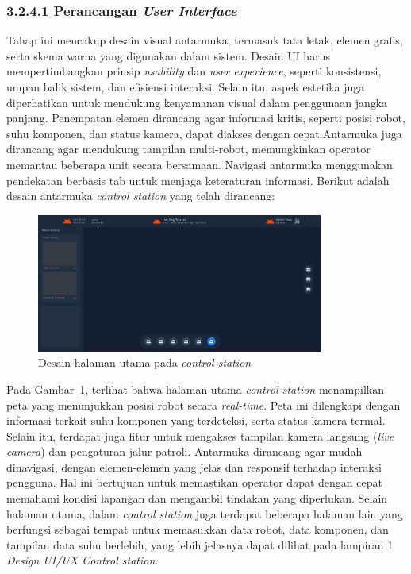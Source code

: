 \subsubsection{3.2.4.1 Perancangan \emph{User Interface}}

Tahap ini mencakup desain visual antarmuka, termasuk tata letak, elemen grafis, serta skema warna yang digunakan dalam sistem. Desain UI harus mempertimbangkan prinsip \emph{usability} dan \emph{user experience}, seperti konsistensi, umpan balik sistem, dan efisiensi interaksi. Selain itu, aspek estetika juga diperhatikan untuk mendukung kenyamanan visual dalam penggunaan jangka panjang. Penempatan elemen dirancang agar informasi kritis, seperti posisi robot, suhu komponen, dan status kamera, dapat diakses dengan cepat.Antarmuka juga dirancang agar mendukung tampilan multi-robot, memungkinkan operator memantau beberapa unit secara bersamaan. Navigasi antarmuka menggunakan pendekatan berbasis tab untuk menjaga keteraturan informasi. Berikut adalah desain antarmuka \emph{control station} yang telah dirancang:

\begin{figure}[H]
  \centering
  \includegraphics[width=0.84\textwidth]{gambar/bab3/homepage.png}
  \caption{Desain halaman utama pada \emph{control station}}
  \label{fig:control-station-robot-main}
\end{figure}


Pada Gambar~\ref{fig:control-station-robot-main}, terlihat bahwa halaman utama \emph{control station} menampilkan peta yang menunjukkan posisi robot secara \emph{real-time}. Peta ini dilengkapi dengan informasi terkait suhu komponen yang terdeteksi, serta status kamera termal. Selain itu, terdapat juga fitur untuk mengakses tampilan kamera langsung (\emph{live camera}) dan pengaturan jalur patroli. Antarmuka dirancang agar mudah dinavigasi, dengan elemen-elemen yang jelas dan responsif terhadap interaksi pengguna. Hal ini bertujuan untuk memastikan operator dapat dengan cepat memahami kondisi lapangan dan mengambil tindakan yang diperlukan. Selain halaman utama, dalam \emph{control station} juga terdapat beberapa halaman lain yang berfungsi sebagai tempat untuk memasukkan data robot, data komponen, dan tampilan data suhu berlebih, yang lebih jelasnya dapat dilihat pada lampiran 1 \emph{Design UI/UX Control station}.


